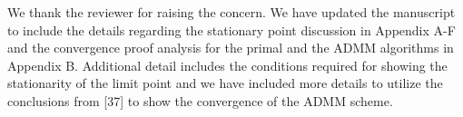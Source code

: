 \begin{enumerate}
 

\resp We thank the reviewer for raising the concern. We have updated the manuscript to include the details regarding the stationary point discussion in Appendix A-F and the convergence proof analysis for the primal and the \ac{ADMM} algorithms in Appendix B. Additional detail includes the conditions required for showing the stationarity of the limit point and we have included more details to utilize the conclusions from [37] to show the convergence of the ADMM scheme.

\end{enumerate}
